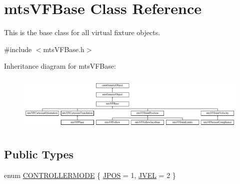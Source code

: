 \hypertarget{classmts_v_f_base}{}\section{mts\+V\+F\+Base Class Reference}
\label{classmts_v_f_base}


This is the base class for all virtual fixture objects.  




{\ttfamily \#include $<$mts\+V\+F\+Base.\+h$>$}

Inheritance diagram for mts\+V\+F\+Base\+:\begin{figure}[H]
\begin{center}
\leavevmode
\includegraphics[height=2.729045cm]{d4/d95/classmts_v_f_base}
\end{center}
\end{figure}
\subsection*{Public Types}
\begin{DoxyCompactItemize}
\item 
enum \hyperlink{classmts_v_f_base_a742dd08f8b70bafeb746cec14d9ee974}{C\+O\+N\+T\+R\+O\+L\+L\+E\+R\+M\+O\+D\+E} \{ \hyperlink{classmts_v_f_base_a742dd08f8b70bafeb746cec14d9ee974a6639d5ab298255f1c757007f7f95a348}{J\+P\+O\+S} = 1, 
\hyperlink{classmts_v_f_base_a742dd08f8b70bafeb746cec14d9ee974ad7f45d2df799c9b4af6977e674b69a84}{J\+V\+E\+L} = 2
 \}
\end{DoxyCompactItemize}
